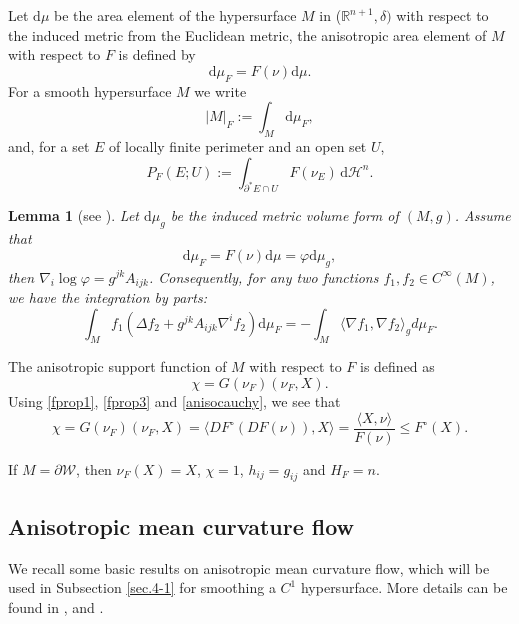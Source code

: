 \documentclass[11pt,reqno]{amsart}
\newtheorem{lemma}[proposition]{Lemma}
\theoremstyle{definition}
\theoremstyle{remark}
\numberwithin{equation}{section}
\begin{document}
	Let $\mathrm{d}\mu$ be the area element of the hypersurface $M$ in ($\mathbb{R}^{n+1},\delta)$ with respect to the induced metric from the Euclidean metric, the anisotropic area element of $M$ with respect to $F$ is defined by
	\begin{equation*}
		\mathrm{d}\mu_F = F(\nu)\mathrm{d}\mu.
	\end{equation*}
	For a smooth hypersurface $M$ we write
	\begin{equation*}
		|M|_F:=\int_M\mathrm{d}\mu_F,
	\end{equation*}
	and, for a set $E$ of locally finite perimeter and an open set $U$,
	\begin{equation*}
		P_F(E;U):=\int_{\partial^*E\cap U}F(\nu_E)\,\mathrm{d}\mathcal H^n.
	\end{equation*}
	\begin{lemma}[see {\cite[Lemma 2.8]{Xia12}}]
		Let $\mathrm{d}\mu_{g}$ be the induced metric volume form of $(M,g)$. Assume that
		\begin{equation*}
			\mathrm{d}\mu_F = F(\nu)\mathrm{d}\mu = \varphi\mathrm{d}\mu_{g},
		\end{equation*}
		then $\nabla_{i} \log\varphi = g^{jk}A_{ijk}$.  Consequently, for any two functions $f_1, f_2\in C^{\infty}(M)$, we have the integration by parts:
		\begin{equation}\label{intebyparts}
			\int_{M} f_1\left(\Delta f_2+ g^{jk}A_{ijk}\nabla^i f_2\right) \mathrm{d}\mu_F = -\int_M\langle \nabla f_1,\nabla f_2\rangle_{g}d\mu_F.
		\end{equation}
	\end{lemma}
	
	The anisotropic support function of $M$ with respect to $F$ is defined as \begin{equation*}
		\chi=G(\nu_F)(\nu_F,X).
	\end{equation*}
	Using \eqref{fprop1}, \eqref{fprop3} and \eqref{anisocauchy}, we see that
	\begin{equation}
		\chi=G(\nu_F)(\nu_F,X)=\langle DF^{\circ}(DF(\nu)),X \rangle=\dfrac{\langle X,\nu \rangle}{F(\nu)}\leq F^{\circ}(X).
		\label{equ-uf0}
	\end{equation}
	
	If $M=\partial\mathcal{W}$, then $\nu_F(X)=X$, $\chi=1$, $h_{ij}=g_{ij}$ and $H_F=n$.
	
	\subsection{Anisotropic mean curvature flow}
	\label{appB}
	We recall some basic results on anisotropic mean curvature flow, which will be used in Subsection \ref{sec.4-1} for smoothing a $C^1$ hypersurface. More details can be found in   \cite{Andrews01}, \cite{WX21} and \cite{CL07}. 
\end{document}
